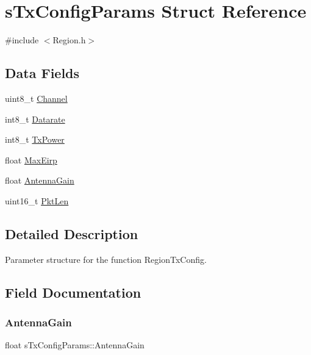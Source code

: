 \hypertarget{structsTxConfigParams}{}\section{s\+Tx\+Config\+Params Struct Reference}
\label{structsTxConfigParams}


{\ttfamily \#include $<$Region.\+h$>$}

\subsection*{Data Fields}
\begin{DoxyCompactItemize}
\item 
uint8\+\_\+t \hyperlink{structsTxConfigParams_a1bb1e56d83744c364a65eb53a7f818fd}{Channel}
\item 
int8\+\_\+t \hyperlink{structsTxConfigParams_aa9e91dccb4852ddf9a5f4e67c82eaf9a}{Datarate}
\item 
int8\+\_\+t \hyperlink{structsTxConfigParams_a6ddec6581ca9bdbb5874fd626d164f67}{Tx\+Power}
\item 
float \hyperlink{structsTxConfigParams_a37a516ffa669246cb054753349f6df4e}{Max\+Eirp}
\item 
float \hyperlink{structsTxConfigParams_a25b5e369267eb186a69633a0fca452f6}{Antenna\+Gain}
\item 
uint16\+\_\+t \hyperlink{structsTxConfigParams_a02956e7075ebaa918006ff5d786dae85}{Pkt\+Len}
\end{DoxyCompactItemize}


\subsection{Detailed Description}
Parameter structure for the function Region\+Tx\+Config. 

\subsection{Field Documentation}
\mbox{\label{structsTxConfigParams_a25b5e369267eb186a69633a0fca452f6}} 
\subsubsection{\texorpdfstring{Antenna\+Gain}{AntennaGain}}
{\footnotesize\ttfamily float s\+Tx\+Config\+Params\+::\+Antenna\+Gain}

